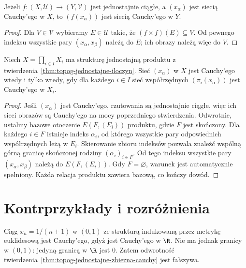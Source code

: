 \begin{stwierdzenie}
\label{prop:topog-jednostajne-f-cauchy}
Jeżeli $f:(X,\mathcal U)\to(Y,\mathcal V)$
jest jednostajnie ciągłe, a
$(x_\alpha)$ jest siecią Cauchy'ego w $X$,
to $(f(x_\alpha))$ jest siecią Cauchy'ego w $Y$.
\end{stwierdzenie}
\begin{proof}
Dla $V\in\mathcal V$ wybieramy
$E\in\mathcal U$ takie, że
$(f\times f)(E)\subseteq V$.
Od pewnego indeksu wszystkie pary
$(x_\alpha,x_\beta)$ należą do $E$;
ich obrazy należą więc do $V$.
\end{proof}

\begin{twierdzenie}
\label{thm:topog-jednostajne-produkt-cauchy}
Niech $X=\prod_{i\in I}X_i$ ma strukturę
jednostajną produktu z
twierdzenia~\ref{thm:topog-jednostajne-iloczyn}.
Sieć $(x_\alpha)$ w $X$ jest Cauchy'ego
wtedy i tylko wtedy, gdy dla każdego $i\in I$
sieć współrzędnych $(\pi_i(x_\alpha))$
jest Cauchy'ego w $X_i$.
\end{twierdzenie}
\begin{proof}
Jeśli $(x_\alpha)$ jest Cauchy'ego,
rzutowania są jednostajnie ciągłe,
więc ich sieci obrazów są Cauchy'ego
na mocy poprzedniego stwierdzenia.
Odwrotnie, ustalmy bazowe otoczenie
$E(F,(E_i))$ produktu, gdzie $F$ jest
skończony. Dla każdego $i\in F$ istnieje
indeks $\alpha_i$, od którego wszystkie
pary odpowiednich współrzędnych leżą
w $E_i$. Skierowanie zbioru indeksów
pozwala znaleźć wspólną górną granicę
skończonej rodziny $(\alpha_i)_{i\in F}$.
Od tego indeksu wszystkie pary
$(x_\alpha,x_\beta)$ należą do
$E(F,(E_i))$. Gdy $F=\varnothing$,
warunek jest automatycznie spełniony.
Każda relacja produktu zawiera bazową,
co kończy dowód.
\end{proof}

\section{Kontrprzykłady i rozróżnienia}
\label{sec:topog-jednostajne-kontrprzyklady}

\begin{przyklad}
\label{ex:topog-jednostajne-cauchy-bez-granicy}
Ciąg $x_n=1/(n+1)$ w $(0,1)$ ze
strukturą indukowaną przez metrykę
euklidesową jest Cauchy'ego, gdyż
jest Cauchy'ego w $\R$. Nie ma jednak
granicy w $(0,1)$: jedyną granicą
w $\R$ jest $0$. Zatem odwrotność
twierdzenia~\ref{thm:topog-jednostajne-zbiezna-cauchy}
jest fałszywa.
\end{przyklad}

